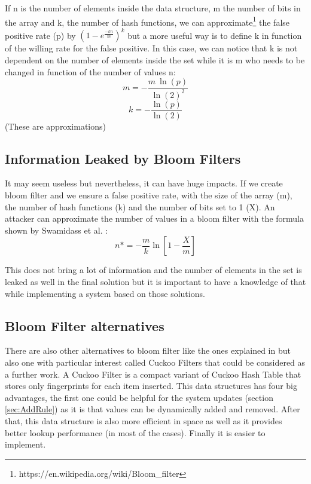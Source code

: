 \documentclass{eplmastersthesis}
\begin{document}
If n is the number of elements inside the data structure, m the number of bits in the array and k, the number of hash functions, we can approximate\footnote{https://en.wikipedia.org/wiki/Bloom\_filter} the false positive rate (p) by $(1-e^{\frac{-kn}{m}})^k$ but a more useful way is to define k in function of the willing rate for the false positive. In this case, we can notice that k is not dependent on the number of elements inside the set while it is m who needs to be changed in function of the number of values n:
$$m = - \frac{m\ \ln(p)}{\ln(2)^2}$$
$$k = - \frac{\ln(p)}{\ln(2)}$$
(These are approximations)

\subsection{Information Leaked by Bloom Filters}
It may seem useless but nevertheless, it can have huge impacts. If we create bloom filter and we ensure a false positive rate, with the size of the array (m), the number of hash functions (k) and the number of bits set to 1 (X). An attacker can approximate the number of values in a bloom filter with the formula shown by Swamidass et al. \cite{swamidass2007mathematical}:
$$n* = - \frac{m}{k} \ln\left[1 - \frac{X}{m}\right] $$

This does not bring a lot of information and the number of elements in the set is leaked as well in the final solution but it is important to have a knowledge of that while implementing a system based on those solutions.

\subsection{Bloom Filter alternatives}
\label{sec:BFAlternatives}
There are also other alternatives to bloom filter like the ones explained in \cite{putze2007cache} but also one with particular interest called Cuckoo Filters \cite{fan2014cuckoo} that could be considered as a further work.
A Cuckoo Filter is a compact variant of Cuckoo Hash Table \cite{pagh2001cuckoo} that stores only fingerprints for each item inserted. This data structures has four big advantages, the first one could be helpful for the system updates (section \ref{sec:AddRule}) as it is that values can be dynamically added and removed. After that, this data structure is also more efficient in space as well as it provides better lookup performance (in most of the cases). Finally it is easier to implement.
\end{document}
